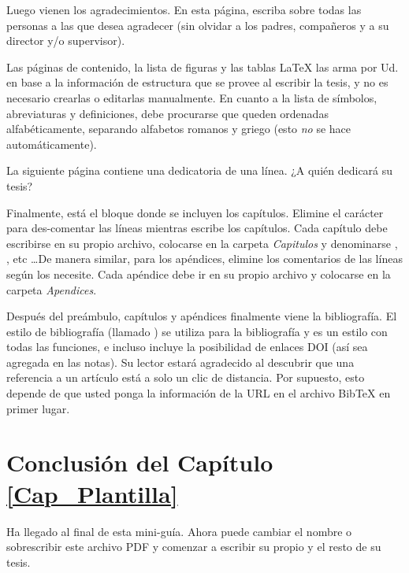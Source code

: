 Luego vienen los agradecimientos. En esta página, escriba sobre todas las personas a las que desea agradecer (sin olvidar a los padres, compañeros y a su director y/o supervisor).

Las páginas de contenido, la lista de figuras y las tablas \LaTeX{}  las arma por Ud. en base a la información de estructura que se provee al escribir la tesis, y no es necesario crearlas o editarlas manualmente. En cuanto a la lista de símbolos, abreviaturas y definiciones, debe procurarse que queden ordenadas alfabéticamente, separando alfabetos romanos y griego (esto \emph{no} se hace automáticamente). 

La siguiente página contiene una dedicatoria de una línea. ¿A quién dedicará su tesis?

Finalmente, está el bloque donde se incluyen los capítulos. Elimine el  carácter  \code{\%} para des-comentar las líneas mientras escribe los capítulos. Cada capítulo debe escribirse en su propio archivo, colocarse en la carpeta \emph{Capitulos} y denominarse , , etc \ldots De manera similar, para los apéndices, elimine los comentarios de las líneas según los necesite. Cada apéndice debe ir en su propio archivo y colocarse en la carpeta \emph{Apendices}.

Después del preámbulo, capítulos y apéndices finalmente viene la bibliografía. El estilo de bibliografía (llamado ) se utiliza para la bibliografía y es un estilo con todas las funciones, e  incluso incluye la posibilidad de  enlaces DOI (así sea agregada en las notas). Su lector estará agradecido al descubrir que una referencia a un artículo está a solo un clic de distancia. Por supuesto, esto depende de que usted ponga la información de la URL en el archivo BibTeX en primer lugar.





\section{Conclusión del Capítulo \ref{Cap_Plantilla} }

Ha llegado al final de esta mini-guía. Ahora puede cambiar el nombre o sobrescribir este archivo PDF y comenzar a escribir su propio  y el resto de su tesis.


